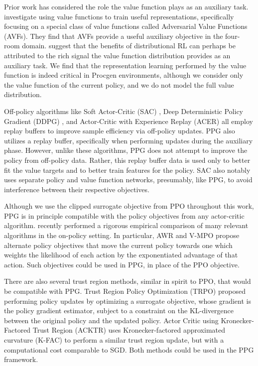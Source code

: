 \documentclass{article}
\begin{document}
Prior work has considered the role the value function plays as an auxiliary task. \cite{bellemare2019geometric} investigate using value functions to train useful representations, specifically focusing on a special class of value functions called Adversarial Value Functions (AVFs). They find that AVFs provide a useful auxiliary objective in the four-room domain. \cite{lyle2019comparative} suggest that the benefits of distributional RL \citep{bellemare2017distributional} can perhaps be attributed to the rich signal the value function distribution provides as an auxiliary task. We find that the representation learning performed by the value function is indeed critical in Procgen environments, although we consider only the value function of the current policy, and we do not model the full value distribution.

Off-policy algorithms like Soft Actor-Critic (SAC) \citep{sac}, Deep Deterministic Policy Gradient (DDPG) \citep{ddpg}, and Actor-Critic with Experience Replay (ACER) \citep{acer} all employ replay buffers to improve sample efficiency via off-policy updates. PPG also utilizes a replay buffer, specifically when performing updates during the auxiliary phase. However, unlike these algorithms, PPG does not attempt to improve the policy from off-policy data. Rather, this replay buffer data is used only to better fit the value targets and to better train features for the policy. SAC also notably uses separate policy and value function networks, presumably, like PPG, to avoid interference between their respective objectives.

Although we use the clipped surrogate objective from PPO \citep{ppo} throughout this work, PPG is in principle compatible with the policy objectives from any actor-critic algorithm. \cite{andrychowicz2020matters} recently performed a rigorous empirical comparison of many relevant algorithms in the on-policy setting. In particular, AWR \citep{awr} and V-MPO \citep{vmpo} propose alternate policy objectives that move the current policy towards one which weights the likelihood of each action by the exponentiated advantage of that action. Such objectives could be used in PPG, in place of the PPO objective.

There are also several trust region methods, similar in spirit to PPO, that would be compatible with PPG. Trust Region Policy Optimization (TRPO) \citep{trpo} proposed performing policy updates by optimizing a surrogate objective, whose gradient is the policy gradient estimator, subject to a constraint on the KL-divergence between the original policy and the updated policy. Actor Critic using Kronecker-Factored Trust Region (ACKTR) \citep{acktr} uses Kronecker-factored approximated curvature (K-FAC) to perform a similar trust region update, but with a computational cost comparable to SGD. Both methods could be used in the PPG framework.
\end{document}
